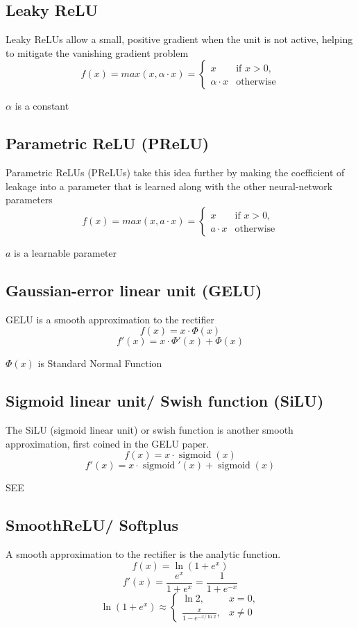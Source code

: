 \subsection{Leaky ReLU \cite{wiki-Rectifier}}\label{Leaky ReLU}
Leaky ReLUs allow a small, positive gradient when the unit is not active, helping to mitigate the vanishing gradient problem
\[
f(x)=max(x, \alpha\cdot x)={\begin{cases}x&{\text{if }}x>0,\\\alpha\cdot x&{\text{otherwise}}\end{cases}} 
\]

$\alpha$ is a constant

\subsection{Parametric ReLU (PReLU) \cite{wiki-Rectifier}}\label{Parametric ReLU (PReLU)}
Parametric ReLUs (PReLUs) take this idea further by making the coefficient of leakage into a parameter that is learned along with the other neural-network parameters
\[
f(x)=max(x, a\cdot x)={\begin{cases}x&{\text{if }}x>0,\\a\cdot x&{\text{otherwise}}\end{cases}}
\]

$a$ is a learnable parameter

\subsection{Gaussian-error linear unit (GELU)}\label{Gaussian-error linear unit (GELU)}
GELU is a smooth approximation to the rectifier
\[
    f(x)=x\cdot \Phi (x)
\]
\[
    f'(x)=x\cdot \Phi '(x)+\Phi (x)
\]

$\Phi (x)$ is Standard Normal Function


\subsection{Sigmoid linear unit/ Swish function (SiLU)}\label{Sigmoid linear unit/ Swish function (SiLU)}
The SiLU (sigmoid linear unit) or swish function is another smooth approximation, first coined in the GELU paper.
\[
    f(x)=x\cdot \operatorname {sigmoid} (x)
\]
\[
    f'(x)=x\cdot \operatorname {sigmoid} '(x)+\operatorname {sigmoid} (x)
\]

SEE 

\subsection{SmoothReLU/ Softplus \cite{wiki-Rectifier}}\label{SmoothReLU/ Softplus}
A smooth approximation to the rectifier is the analytic function.
\[ 
f(x)=\ln(1+e^{x}) 
\]
\[
f'(x)={\displaystyle\frac {e^{x}}{1+e^{x}}}={\displaystyle \frac {1}{1+e^{-x}}} 
\]
\[ 
\ln \left(1+e^{x}\right)\approx {\begin{cases}\ln 2,&x=0,\\[6pt]{\displaystyle \frac {x}{1-e^{-x/\ln 2}}},&x\neq 0\end{cases}} 
\]

